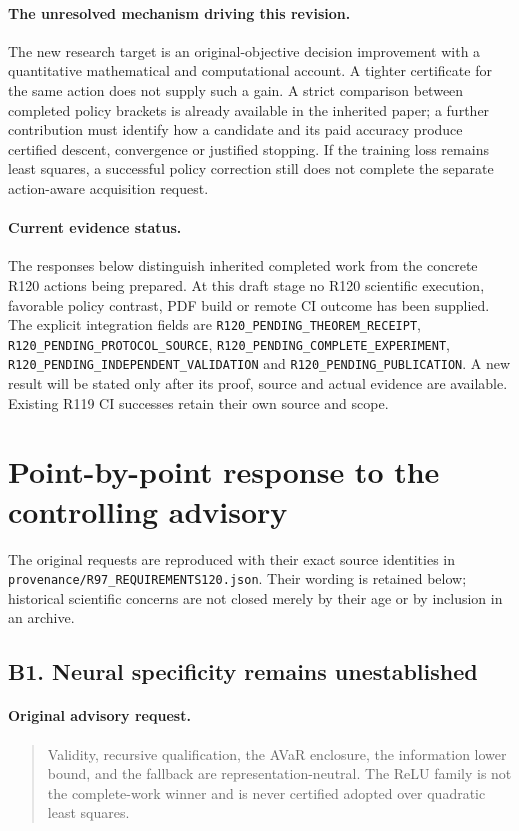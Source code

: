 \paragraph{The unresolved mechanism driving this revision.}
The new research target is an original-objective decision improvement with a quantitative mathematical and computational account. A tighter certificate for the same action does not supply such a gain. A strict comparison between completed policy brackets is already available in the inherited paper; a further contribution must identify how a candidate and its paid accuracy produce certified descent, convergence or justified stopping. If the training loss remains least squares, a successful policy correction still does not complete the separate action-aware acquisition request.

\paragraph{Current evidence status.}
The responses below distinguish inherited completed work from the concrete R120 actions being prepared. At this draft stage no R120 scientific execution, favorable policy contrast, PDF build or remote CI outcome has been supplied. The explicit integration fields are \texttt{R120\_PENDING\_THEOREM\_RECEIPT}, \texttt{R120\_PENDING\_PROTOCOL\_SOURCE}, \texttt{R120\_PENDING\_COMPLETE\_EXPERIMENT}, \texttt{R120\_PENDING\_INDEPENDENT\_VALIDATION} and \texttt{R120\_PENDING\_PUBLICATION}. A new result will be stated only after its proof, source and actual evidence are available. Existing R119 CI successes retain their own source and scope.

\section{Point-by-point response to the controlling advisory}
The original requests are reproduced with their exact source identities in
\nolinkurl{provenance/R97_REQUIREMENTS120.json}. Their wording is retained below; historical scientific concerns are not closed merely by their age or by inclusion in an archive.

\subsection{B1. Neural specificity remains unestablished}
\label{response120:B1}
\paragraph{Original advisory request.}
\begin{quote}
Validity, recursive qualification, the AVaR enclosure, the information lower bound, and the fallback are representation-neutral. The ReLU family is not the complete-work winner and is never certified adopted over quadratic least squares.
\end{quote}
